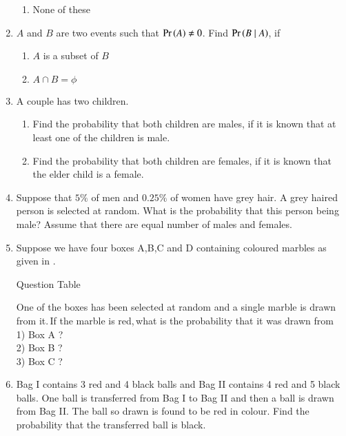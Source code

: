 \begin{enumerate}[label=\thechapter.\arabic*,ref=\thechapter.\theenumi]
\begin{enumerate}
\item None of these
\end{enumerate}
\solution

\item $A$ and $B$ are two events such that $\Pr\left(A\right) \neq 0$. Find $\Pr\left(B \mid A\right)$, if
\begin{enumerate}
\item $A$ is a subset of $B$
\item $A \cap B = \phi$
\end{enumerate}
\solution 
	
\item A couple has two children.
\begin{enumerate}
\item Find the probability that both children are males, if it is known that at least one of the children is male.
\item Find the probability that both children are females, if it is known that the elder child is a female.
\end{enumerate}
\solution 
	
	\item Suppose that $5\%$ of men and $0.25\%$ of women have grey hair. A grey haired person is selected at random. What is the probability that this person being male? Assume that there are equal number of males and females.
\\
\solution
		
\item Suppose we have four boxes A,B,C and D containing coloured marbles as given in . 
\begin{table}[htbp]
\centering

\caption{Question Table}
\label{tab:12/13/6/12/table1}
\end{table}
One of the boxes has been selected at random and a single marble is drawn from it.$\,$If the marble is red,$\,$what is the probability that it was drawn from \\1) Box A ?\\2) Box B ?\\3) Box C ?
\\
\solution 
	
\item Bag I contains 3 red and 4 black balls and Bag II contains 4 red and 5 black balls.
One ball is transferred from Bag I to Bag II and then a ball is drawn from Bag II.
The ball so drawn is found to be red in colour. Find the probability that the
transferred ball is black. 
\\

\end{enumerate}
